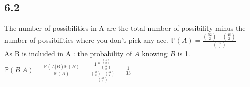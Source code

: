 \documentclass{article}
\begin{document}
    \subsection*{6.2}
    The number of possibilities in A are the total number of possibility minus the number of possibilities where you don't pick any ace.
    $\mathbb{P}(A) = \frac{\binom{52}{2}-\binom{48}{2}}{\binom{52}{2}}$
    \\
    As B is included in A : the probability of $A$ knowing $B$ is 1.
    \\

    $\mathbb{P}(B|A) = \frac{\mathbb{P}(A|B)\mathbb{P}(B)}{\mathbb{P}(A)} = \frac{1*\frac{\binom{4}{2}}{\binom{52}{2}}}{\frac{\binom{52}{2}-\binom{48}{2}}{\binom{52}{2}}} = \frac{1}{33}$
\end{document}
